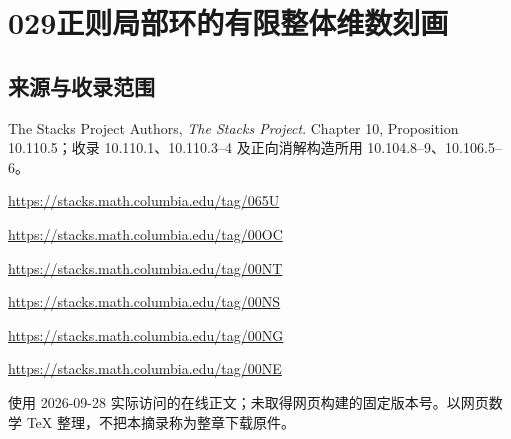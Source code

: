\documentclass[UTF8,11pt]{ctexart}
\theoremstyle{definition}
\begin{document}
\section*{029\quad 正则局部环的有限整体维数刻画}
\subsection*{来源与收录范围}
The Stacks Project Authors, \emph{The Stacks Project}. Chapter 10, Proposition 10.110.5；收录 10.110.1、10.110.3--4 及正向消解构造所用 10.104.8--9、10.106.5--6。
\par\url{https://stacks.math.columbia.edu/tag/065U}
\par\url{https://stacks.math.columbia.edu/tag/00OC}
\par\url{https://stacks.math.columbia.edu/tag/00NT}
\par\url{https://stacks.math.columbia.edu/tag/00NS}
\par\url{https://stacks.math.columbia.edu/tag/00NG}
\par\url{https://stacks.math.columbia.edu/tag/00NE}
\par 使用 2026-09-28 实际访问的在线正文；未取得网页构建的固定版本号。以网页数学 TeX 整理，不把本摘录称为整章下载原件。
\end{document}
